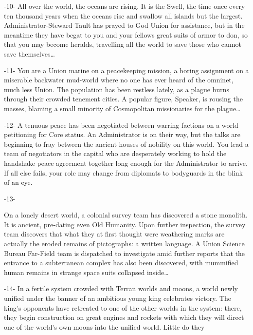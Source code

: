                                                         -10-  
All over the world, the oceans are rising. It is the Swell, the time once every ten thousand years  
when the oceans rise and swallow all islands but the largest. Administrator-Steward Tault has  
prayed to God Union for assistance, but in the meantime they have begat to you and your fellows  
great suits of armor to don, so that you may become heralds, travelling all the world to save those  
who cannot save themselves…  

                                                        -11-  
You are a Union marine on a peacekeeping mission, a boring assignment on a miserable  
backwater mud-world where no one has ever heard of the omninet, much less Union. The  
population has been restless lately, as a plague burns through their crowded tenement cities. A  
popular figure, Speaker, is rousing the masses, blaming a small minority of Cosmopolitan  
missionaries for the plague…  

                                                        -12-  
A tenuous peace has been negotiated between warring factions on a world petitioning for Core  
status. An Administrator is on their way, but the talks are beginning to fray between the ancient  
houses of nobility on this world. You lead a team of negotiators in the capital who are desperately  
working to hold the handshake peace agreement together long enough for the Administrator to  
arrive. If all else fails, your role may change from diplomats to bodyguards in the blink of an eye.
 
 
 
                                                        -13-
 
On a lonely desert world, a colonial survey team has discovered a stone monolith. It is ancient,  
pre-dating even Old Humanity. Upon further inspection, the survey team discovers that what they  
at first thought were weathering marks are actually the eroded remains of pictographs: a written  
language. A Union Science Bureau Far-Field team is dispatched to investigate amid further  
reports that the entrance to a subterranean complex has also been discovered, with mummified  
human remains in strange space suits collapsed inside…  

                                                        -14-  
In a fertile system crowded with Terran worlds and moons, a world newly unified under the  
banner of an ambitious young king celebrates victory. The king’s opponents have retreated to one  
of the other worlds in the system: there, they begin construction on great engines and rockets  
with which they will direct one of the world’s own moons into the unified world. Little do they  

